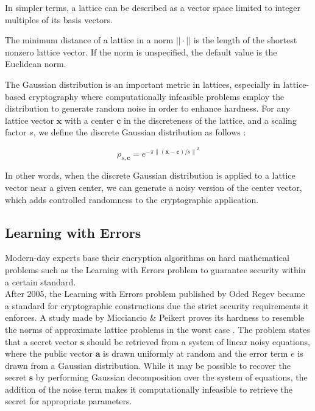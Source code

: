 \documentclass[11pt,
  titlepage=false,
  abstract=on,
]{scrreprt}
\begin{document}
In simpler terms, a lattice can be described as a vector space limited to integer multiples of its basis vectors.

The minimum distance of a lattice in a norm $||\cdot||$ is the length of the shortest nonzero lattice vector. If the norm is unspecified, the default
value is the Euclidean norm.

The Gaussian distribution is an important metric in lattices, especially in lattice-based cryptography where computationally infeasible problems employ the distribution
to generate random noise in order to enhance hardness. For any lattice vector $\mathbf{x}$ with a center $\mathbf{c}$ in the discreteness of the lattice, and a scaling factor $s$,
we define the discrete Gaussian distribution as follows \cite{WCToAVGCase}:

\begin{equation*}
  \rho_{s,\mathbf{c}} = e^{-\pi {\| (\mathbf{x} - \mathbf{c}) / s\|}^2}
\end{equation*}

In other words, when the discrete Gaussian distribution is applied to a lattice vector near a given center, we can generate a noisy version of the center vector, which adds controlled randomness 
to the cryptographic application.

\subsection{Learning with Errors}
Modern-day experts base their encryption algorithms on hard mathematical problems such as the Learning with Errors problem to guarantee security within a certain standard.\\
After 2005, the Learning with Errors problem published by Oded Regev \cite{regev2010learning} became a standard for cryptographic constructions due the strict security requirements it enforces.
A study made by Micciancio \& Peikert proves its hardness to resemble the norms of approximate lattice problems in the worst case \cite{micciancio2013hardness}.
The problem states that a secret vector $\textbf{s}$ should be retrieved from a system of linear noisy equations, where the public vector $\textbf{a}$ is drawn uniformly at random
and the error term $\textit{e}$ is drawn from a Gaussian distribution. While it may be possible to recover the secret $\textbf{s}$
by performing Gaussian decomposition over the system of equations, the addition of the noise term makes it computationally infeasible to retrieve the
secret for appropriate parameters.
\end{document}
